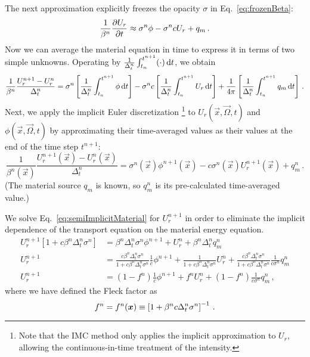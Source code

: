 The next approximation explicitly freezes the opacity $\sigma$ in
Eq.~\eqref{eq:frozenBeta}:
\begin{equation*}
  \frac{1}{\beta^n}
  \frac{\partial U_r}{\partial t} \approx \sigma^n \phi - \sigma^n c U_r + q_m \,.
\end{equation*}
Now we can average the material equation in time to express it in terms of two
simple unknowns. Operating by
$\frac{1}{\Delta_t^n}\int_{t_n}^{t^{n+1}} (\cdot) \mathop{}\!\mathrm{d} t$,
we obtain
\begin{equation*}
  \frac{1}{\beta^n}
  \frac{U_r^{n+1} - U_r^n}{\Delta_t^n} = \sigma^n \left[
  \frac{1}{\Delta_t^n}\int_{t_n}^{t^{n+1}} \phi \mathop{}\!\mathrm{d} t
  \right] - \sigma^n c \left[
  \frac{1}{\Delta_t^n}\int_{t_n}^{t^{n+1}} U_r \mathop{}\!\mathrm{d} t \right]
   + \frac{1}{4\pi}\left[
  \frac{1}{\Delta_t^n}\int_{t_n}^{t^{n+1}} q_m \mathop{}\!\mathrm{d} t \right]\,.
\end{equation*}
Next, we apply the implicit Euler discretization%
\footnote{Note that the IMC method only applies the implicit approximation to
$U_r$, allowing the continuous-in-time treatment of the intensity.}
to $U_r(\vec{x}, \vec{\Omega}, t)$ and $\phi(\vec{x}, \vec{\Omega}, t)$ by
approximating their time-averaged values as their values at the end of the time
step $t^{n+1}$:
\begin{equation} \label{eq:semiImplicitMaterial}
  \frac{1}{\beta^n(\vec{x})}
  \frac{U_r^{n+1}(\vec{x}) - U_r^n(\vec{x})}{\Delta_t^n}
  = \sigma^n(\vec{x}) \phi^{n+1}(\vec{x})
  - c \sigma^n(\vec{x}) U_r^{n+1}(\vec{x}) + q_m^n \,.
\end{equation}
(The material source $q_m$ is known, so $q_m^n$ is its pre-calculated
time-averaged value.)

\thesisclearpage
We solve Eq.~\eqref{eq:semiImplicitMaterial} for $U_r^{n+1}$ in order to
eliminate the implicit dependence of the transport equation on the material
energy equation.
\begin{align} \nonumber
  U_r^{n+1} [ 1 + c \beta^n \Delta_t^n \sigma^n ]
  &= \beta^n \Delta_t^n \sigma^n\phi^{n+1} + U_r^n + \beta^n \Delta_t^n q_m^n
   \\ \nonumber
  U_r^{n+1}
  &= \frac{ c \beta^n \Delta_t^n \sigma^n }{ 1 + c \beta^n \Delta_t^n \sigma^n}
  \frac1c \phi^{n+1} + \frac1{ 1 + c \beta^n \Delta_t^n \sigma^n}
  U_r^n
  + \frac{ c \beta^n \Delta_t^n \sigma^n}{ 1 + c \beta^n \Delta_t^n \sigma^n}
  \frac1{c\sigma^n} q_m^n
  \\ \label{eq:urNPlusOne}
  U_r^{n+1}
  &= \left(1 - f^n\right) \frac1c \phi^{n+1} + f^n U_r^n
  + \left(1 - f^n\right)\frac{1}{c \sigma^n} q_m^n\,,
\end{align}
where we have defined the Fleck factor \cite{Fle1971} as
\begin{equation} \label{eq:fleckFactor}
  f^n = f^n(\bm{x}) \equiv \left[ 1 + \beta^n c \Delta_t^n \sigma^n
  \right]^{-1} \,.
\end{equation}

